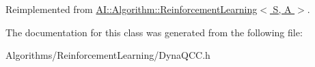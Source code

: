 Reimplemented from \hyperlink{classAI_1_1Algorithm_1_1ReinforcementLearning_a25d7fa245a79e61061436dc0f1db90cb}{A\-I\-::\-Algorithm\-::\-Reinforcement\-Learning$<$ S, A $>$}.



The documentation for this class was generated from the following file\-:\begin{DoxyCompactItemize}
\item 
Algorithms/\-Reinforcement\-Learning/Dyna\-Q\-C\-C.\-h\end{DoxyCompactItemize}
